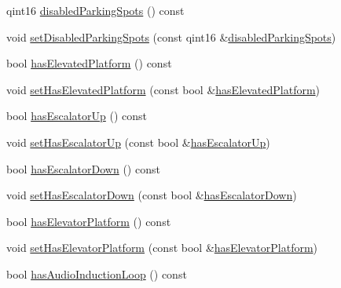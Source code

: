 \begin{DoxyCompactItemize}
\item 
qint16 \mbox{\hyperlink{classQRail_1_1StationEngine_1_1Station_a462fa31e61a725a498055b3fcba8cce5}{disabled\+Parking\+Spots}} () const
\item 
void \mbox{\hyperlink{classQRail_1_1StationEngine_1_1Station_a2b3e193aee01e6379e8f91b27172f391}{set\+Disabled\+Parking\+Spots}} (const qint16 \&\mbox{\hyperlink{classQRail_1_1StationEngine_1_1Station_a462fa31e61a725a498055b3fcba8cce5}{disabled\+Parking\+Spots}})
\item 
bool \mbox{\hyperlink{classQRail_1_1StationEngine_1_1Station_a406d35e41d5d6aa21d1d6270315b0020}{has\+Elevated\+Platform}} () const
\item 
void \mbox{\hyperlink{classQRail_1_1StationEngine_1_1Station_a3c7125cae3e2524e3ebab483d607c952}{set\+Has\+Elevated\+Platform}} (const bool \&\mbox{\hyperlink{classQRail_1_1StationEngine_1_1Station_a406d35e41d5d6aa21d1d6270315b0020}{has\+Elevated\+Platform}})
\item 
bool \mbox{\hyperlink{classQRail_1_1StationEngine_1_1Station_ab89210b5f7e821c7b426022328d33871}{has\+Escalator\+Up}} () const
\item 
void \mbox{\hyperlink{classQRail_1_1StationEngine_1_1Station_abcd22776685752bf1f2a3cfa0f84bcc0}{set\+Has\+Escalator\+Up}} (const bool \&\mbox{\hyperlink{classQRail_1_1StationEngine_1_1Station_ab89210b5f7e821c7b426022328d33871}{has\+Escalator\+Up}})
\item 
bool \mbox{\hyperlink{classQRail_1_1StationEngine_1_1Station_abc49d1258d3dd4b7b3915c37eec8ce8b}{has\+Escalator\+Down}} () const
\item 
void \mbox{\hyperlink{classQRail_1_1StationEngine_1_1Station_a13d18cc2d7b1ceb4e855c686780f5fe4}{set\+Has\+Escalator\+Down}} (const bool \&\mbox{\hyperlink{classQRail_1_1StationEngine_1_1Station_abc49d1258d3dd4b7b3915c37eec8ce8b}{has\+Escalator\+Down}})
\item 
bool \mbox{\hyperlink{classQRail_1_1StationEngine_1_1Station_ad942fab0cd4c1bd8bac2858b767cbd8d}{has\+Elevator\+Platform}} () const
\item 
void \mbox{\hyperlink{classQRail_1_1StationEngine_1_1Station_a0b35cc4aa9f9ae7dc9503c7ea0919cb1}{set\+Has\+Elevator\+Platform}} (const bool \&\mbox{\hyperlink{classQRail_1_1StationEngine_1_1Station_ad942fab0cd4c1bd8bac2858b767cbd8d}{has\+Elevator\+Platform}})
\item 
bool \mbox{\hyperlink{classQRail_1_1StationEngine_1_1Station_a4f0fe605690b460d88064bd4d36fe1ea}{has\+Audio\+Induction\+Loop}} () const
\item 

\end{DoxyCompactItemize}
